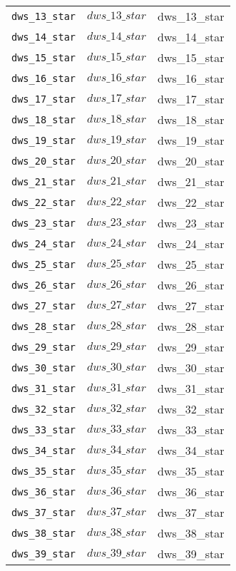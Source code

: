 \begin{center}
\begin{longtable}{ccc}
\texttt{dws\_13\_star} & $dws\_13\_star$ & dws\_13\_star\\
\texttt{dws\_14\_star} & $dws\_14\_star$ & dws\_14\_star\\
\texttt{dws\_15\_star} & $dws\_15\_star$ & dws\_15\_star\\
\texttt{dws\_16\_star} & $dws\_16\_star$ & dws\_16\_star\\
\texttt{dws\_17\_star} & $dws\_17\_star$ & dws\_17\_star\\
\texttt{dws\_18\_star} & $dws\_18\_star$ & dws\_18\_star\\
\texttt{dws\_19\_star} & $dws\_19\_star$ & dws\_19\_star\\
\texttt{dws\_20\_star} & $dws\_20\_star$ & dws\_20\_star\\
\texttt{dws\_21\_star} & $dws\_21\_star$ & dws\_21\_star\\
\texttt{dws\_22\_star} & $dws\_22\_star$ & dws\_22\_star\\
\texttt{dws\_23\_star} & $dws\_23\_star$ & dws\_23\_star\\
\texttt{dws\_24\_star} & $dws\_24\_star$ & dws\_24\_star\\
\texttt{dws\_25\_star} & $dws\_25\_star$ & dws\_25\_star\\
\texttt{dws\_26\_star} & $dws\_26\_star$ & dws\_26\_star\\
\texttt{dws\_27\_star} & $dws\_27\_star$ & dws\_27\_star\\
\texttt{dws\_28\_star} & $dws\_28\_star$ & dws\_28\_star\\
\texttt{dws\_29\_star} & $dws\_29\_star$ & dws\_29\_star\\
\texttt{dws\_30\_star} & $dws\_30\_star$ & dws\_30\_star\\
\texttt{dws\_31\_star} & $dws\_31\_star$ & dws\_31\_star\\
\texttt{dws\_32\_star} & $dws\_32\_star$ & dws\_32\_star\\
\texttt{dws\_33\_star} & $dws\_33\_star$ & dws\_33\_star\\
\texttt{dws\_34\_star} & $dws\_34\_star$ & dws\_34\_star\\
\texttt{dws\_35\_star} & $dws\_35\_star$ & dws\_35\_star\\
\texttt{dws\_36\_star} & $dws\_36\_star$ & dws\_36\_star\\
\texttt{dws\_37\_star} & $dws\_37\_star$ & dws\_37\_star\\
\texttt{dws\_38\_star} & $dws\_38\_star$ & dws\_38\_star\\
\texttt{dws\_39\_star} & $dws\_39\_star$ & dws\_39\_star\\

\end{longtable}
\end{center}
